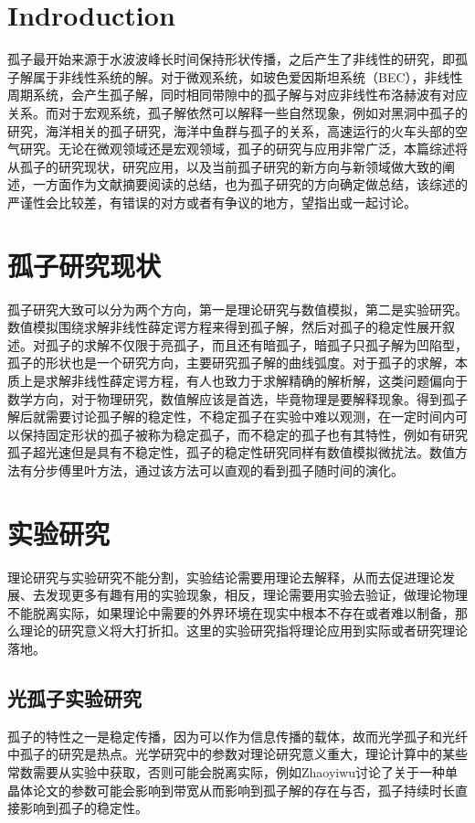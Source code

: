 \documentclass{article}
\begin{document}
\begin{multicols}{2}
\section{Indroduction}
孤子最开始来源于水波波峰长时间保持形状传播，之后产生了非线性的研究，即孤子解属于非线性系统的解。对于微观系统，如玻色爱因斯坦系统（BEC），非线性周期系统，会产生孤子解，同时相同带隙中的孤子解与对应非线性布洛赫波有对应关系\cite{Zhang.2009}。而对于宏观系统，孤子解依然可以解释一些自然现象，例如对黑洞中孤子的研究\cite{dymnikova2020regular}，海洋相关的孤子研究\cite{stepanyants2020nonlinear,zhao2019the}，海洋中鱼群与孤子的关系\cite{soliton_russion}，高速运行的火车头部的空气研究\cite{soliton_russion}。无论在微观领域还是宏观领域，孤子的研究与应用非常广泛，本篇综述将从孤子的研究现状，研究应用，以及当前孤子研究的新方向与新领域做大致的阐述，一方面作为文献摘要阅读的总结，也为孤子研究的方向确定做总结，该综述的严谨性会比较差，有错误的对方或者有争议的地方，望指出或一起讨论。

\section{孤子研究现状}
孤子研究大致可以分为两个方向，第一是理论研究与数值模拟，第二是实验研究。数值模拟围绕求解非线性薛定谔方程来得到孤子解，然后对孤子的稳定性展开叙述。对孤子的求解不仅限于亮孤子，而且还有暗孤子\cite{article,2017Decay}，暗孤子只孤子解为凹陷型，孤子的形状也是一个研究方向，主要研究孤子解的曲线弧度\cite{Umbetova_2019}。对于孤子的求解，本质上是求解非线性薛定谔方程\cite{soliton_russion2}，有人也致力于求解精确的解析解\cite{2020Exact,inproceedings}，这类问题偏向于数学方向，对于物理研究，数值解应该是首选，毕竟物理是要解释现象。得到孤子解后就需要讨论孤子解的稳定性，不稳定孤子在实验中难以观测，在一定时间内可以保持固定形状的孤子被称为稳定孤子，而不稳定的孤子也有其特性，例如有研究孤子超光速但是具有不稳定性\cite{1937-1632_2020_8_2285}，孤子的稳定性研究同样有数值模拟微扰法\cite{article_stable}。数值方法有分步傅里叶方法\cite{article_step}，通过该方法可以直观的看到孤子随时间的演化。
\section{实验研究}
理论研究与实验研究不能分割，实验结论需要用理论去解释，从而去促进理论发展、去发现更多有趣有用的实验现象，相反，理论需要用实验去验证，做理论物理不能脱离实际，如果理论中需要的外界环境在现实中根本不存在或者难以制备，那么理论的研究意义将大打折扣。这里的实验研究指将理论应用到实际或者研究理论落地。
\subsection{光孤子实验研究}
孤子的特性之一是稳定传播，因为可以作为信息传播的载体，故而光学孤子\cite{mariana2020latest,kulakovskii2019coherence}和光纤中孤子\cite{article_step,morin2020sub,chen2020toward,mayteevarunyoo2020spatiotemporal}的研究是热点。光学研究中的参数对理论研究意义重大，理论计算中的某些常数需要从实验中获取，否则可能会脱离实际，例如Zhaoyiwu讨论了关于一种单晶体\cite{zhao2020generation}论文的参数可能会影响到带宽从而影响到孤子解的存在与否，孤子持续时长直接影响到孤子的稳定性。


\end{multicols}
\end{document}
